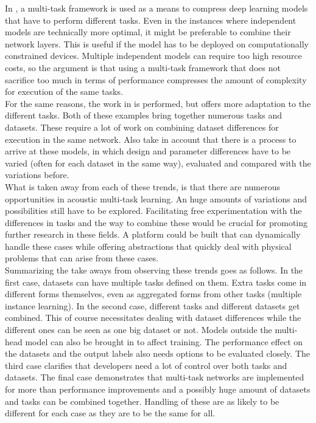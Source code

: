 In \cite{georgiev2017heterogeneous}, a multi-task framework is used as a means to compress deep learning models that have to perform different tasks. Even in the instances where independent models are technically more optimal, it might be preferable to combine their network layers. This is useful if the model has to be deployed on computationally constrained devices. Multiple independent models can require too high resource costs, so the argument is that using a multi-task framework that does not sacrifice too much in terms of performance compresses the amount of complexity for execution of the same tasks.\\

For the same reasons, the work in \cite{tagliasacchi2020multi} is performed, but offers more adaptation to the different tasks. Both of these examples bring together numerous tasks and datasets. These require a lot of work on combining dataset differences for execution in the same network. Also take in account that there is a process to arrive at these models, in which design and parameter differences have to be varied (often for each dataset in the same way), evaluated and compared with the variations before. \\

What is taken away from each of these trends, is that there are numerous opportunities in acoustic multi-task learning. An huge amounts of variations and possibilities still have to be explored. Facilitating free experimentation with the differences in tasks and the way to combine these would be crucial for promoting further research in these fields. A platform could be built that can dynamically handle these cases while offering abstractions that quickly deal with physical problems that can arise from these cases. \\

Summarizing the take aways from observing these trends goes as follows. In the first case, datasets can have multiple tasks defined on them. Extra tasks come in different forms themselves, even as aggregated forms from other tasks (multiple instance learning). In the second case, different tasks and different datasets get combined. This of course necessitates dealing with dataset differences while the different ones can be seen as one big dataset or not. Models outside the multi-head model can also be brought in to affect training. The performance effect on the datasets and the output labels also needs options to be evaluated closely. The third case clarifies that developers need a lot of control over both tasks and datasets. The final case demonstrates that multi-task networks are implemented for more than performance improvements and a possibly huge amount of datasets and tasks can be combined together. Handling of these are as likely to be different for each case as they are to be the same for all.\\

